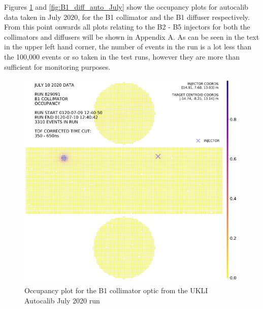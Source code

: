 Figures \ref{fig:B1_coll_auto_July} and \ref{fig:B1_diff_auto_July} show the occupancy plots for autocalib data taken in July 2020, for the B1 collimator and the B1 diffuser respectively. From this point onwards all plots relating to the B2 - B5 injectors for both the collimators and diffusers will be shown in Appendix A. As can be seen in the text in the upper left hand corner, the number of events in the run is a lot less than the 100,000 events or so taken in the test runs, however they are more than sufficient for monitoring purposes.


\begin{figure}
    \centering
    
    \begin{minipage}{0.47\textwidth}
        \centering
        \includegraphics[width=\textwidth]{Figures/B1_occupancy_coll_auto.PNG} %
        \caption{Occupancy plot for the B1 collimator optic from the UKLI Autocalib July 2020 run}
        \label{fig:B1_coll_auto_July}
    \end{minipage}\hfill
    \begin{minipage}{0.47\textwidth}
        \centering

\end{minipage}
\end{figure}
